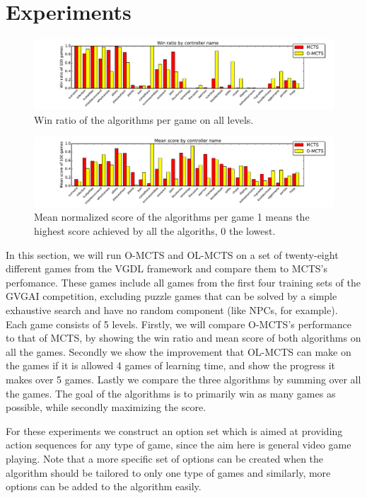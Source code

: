 \section{Experiments}
\label{sec:experiments}
\begin{figure}
	\centering
	\includegraphics[width=\textwidth]{includes/wins}
	\vspace{-.8cm}
	\caption{Win ratio of the algorithms per game on all levels.}
	\label{fig:wins}
\end{figure}

\begin{figure}
	\centering
	\includegraphics[width=\textwidth]{includes/scores}
	\vspace{-.8cm}
	\caption{Mean normalized score of the algorithms per game 1 means the
	highest score achieved by all the algoriths, 0 the lowest.}
	\label{fig:scores}
\end{figure}

In this section, we will run O-MCTS and OL-MCTS on a set of twenty-eight
different games from the VGDL framework and compare them to MCTS's perfomance.
These games include all games from the first four training sets of the GVGAI
competition, excluding puzzle games that can be solved by a simple exhaustive
search and have no random component (like NPCs, for example). Each game consists
of 5 levels. Firstly, we will compare O-MCTS's performance to that of MCTS, by
showing the win ratio and mean score of both algorithms on all the games.
Secondly we show the improvement that OL-MCTS can make on the games if it is
allowed 4 games of learning time, and show the progress it makes over 5 games.
Lastly we compare the three algorithms by summing over all the games. The goal
of the algorithms is to primarily win as many games as possible, while secondly
maximizing the score. 

For these experiments we construct an option set which is aimed at providing
action sequences for any type of game, since the aim here is general video game
playing. Note that a more specific set of options can be created when the
algorithm should be tailored to only one type of games and similarly, more
options can be added to the algorithm easily.

